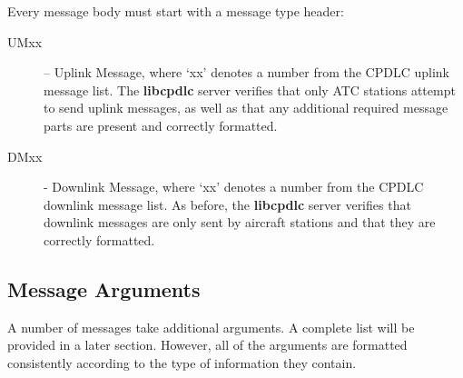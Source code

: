\documentclass[a4paper,12pt]{article}
\newcommand{\libcpdlc}{\textbf{libcpdlc}\xspace}
\begin{document}
Every message body must start with a message type header:

\begin{description}

\item[UMxx] -- Uplink Message, where `xx' denotes a number from the CPDLC
uplink message list. The \libcpdlc server verifies that only ATC stations
attempt to send uplink messages, as well as that any additional required
message parts are present and correctly formatted.

\item[DMxx] - Downlink Message, where `xx' denotes a number from the
CPDLC downlink message list. As before, the \libcpdlc server verifies
that downlink messages are only sent by aircraft stations and that they
are correctly formatted.

\end{description}

\subsection{Message Arguments}

A number of messages take additional arguments. A complete list will be
provided in a later section. However, all of the arguments are formatted
consistently according to the type of information they contain.
\end{document}
